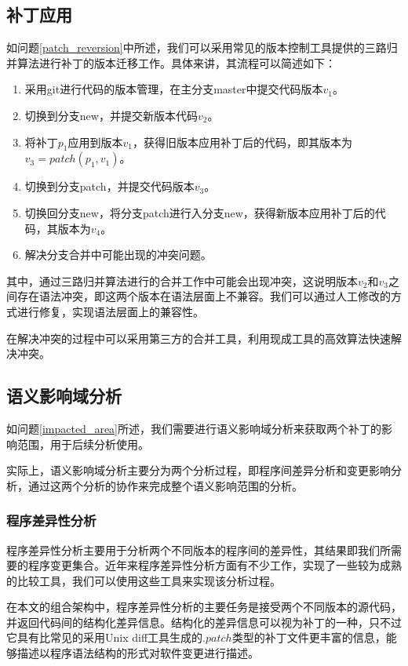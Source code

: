 \subsection{补丁应用}

如问题\ref {patch_reversion}中所述，我们可以采用常见的版本控制工具提供的三路归并算法进行补丁的版本迁移工作。具体来讲，其流程可以简述如下：
\begin{enumerate}
	\item 采用git进行代码的版本管理，在主分支master中提交代码版本$v_1$。
	\item 切换到分支new，并提交新版本代码$v_2$。
	\item 将补丁$p_1$应用到版本$v_1$，获得旧版本应用补丁后的代码，即其版本为$v_3 = patch(p_1,v_1)$。
	\item 切换到分支patch，并提交代码版本$v_3$。
	\item 切换回分支new，将分支patch进行入分支new，获得新版本应用补丁后的代码，其版本为$v_4$。
	\item 解决分支合并中可能出现的冲突问题。
\end{enumerate}


其中，通过三路归并算法进行的合并工作中可能会出现冲突，这说明版本$v_2$和$v_3$之间存在语法冲突，即这两个版本在语法层面上不兼容。我们可以通过人工修改的方式进行修复，实现语法层面上的兼容性。

在解决冲突的过程中可以采用第三方的合并工具，利用现成工具的高效算法快速解决冲突。

\subsection{语义影响域分析}

如问题\ref {impacted_area}所述，我们需要进行语义影响域分析来获取两个补丁的影响范围，用于后续分析使用。

实际上，语义影响域分析主要分为两个分析过程，即程序间差异分析和变更影响分析，通过这两个分析的协作来完成整个语义影响范围的分析。

\subsubsection{程序差异性分析}

程序差异性分析主要用于分析两个不同版本的程序间的差异性，其结果即我们所需要的程序变更集合。近年来程序差异性分析方面有不少工作，实现了一些较为成熟的比较工具，我们可以使用这些工具来实现该分析过程。

在本文的组合架构中，程序差异性分析的主要任务是接受两个不同版本的源代码，并返回代码间的结构化差异信息。结构化的差异信息可以视为补丁的一种，只不过它具有比常见的采用Unix diff工具生成的$.patch$类型的补丁文件更丰富的信息，能够描述以程序语法结构的形式对软件变更进行描述。

